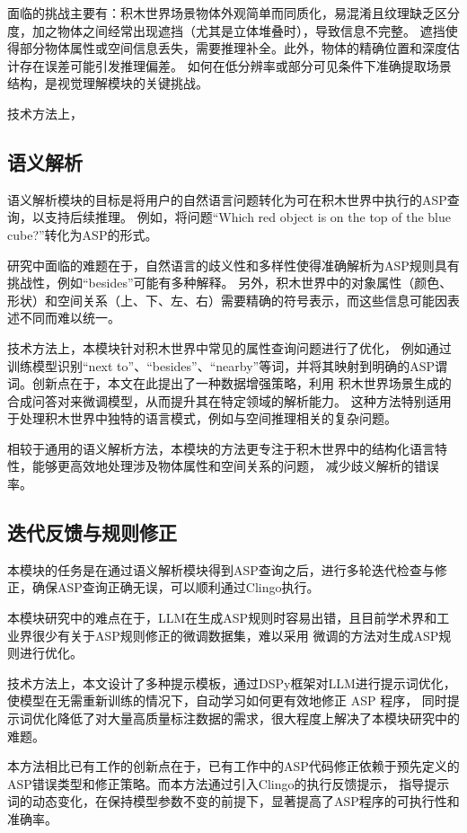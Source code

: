 面临的挑战主要有：积木世界场景物体外观简单而同质化，易混淆且纹理缺乏区分度，加之物体之间经常出现遮挡（尤其是立体堆叠时），导致信息不完整。
遮挡使得部分物体属性或空间信息丢失，需要推理补全。此外，物体的精确位置和深度估计存在误差可能引发推理偏差。
如何在低分辨率或部分可见条件下准确提取场景结构，是视觉理解模块的关键挑战。

技术方法上，
\subsection{语义解析}
语义解析模块的目标是将用户的自然语言问题转化为可在积木世界中执行的ASP查询，以支持后续推理。
例如，将问题“Which red object is on the top of the blue cube?”转化为ASP的形式。

研究中面临的难题在于，自然语言的歧义性和多样性使得准确解析为ASP规则具有挑战性，例如“besides”可能有多种解释。
另外，积木世界中的对象属性（颜色、形状）和空间关系（上、下、左、右）需要精确的符号表示，而这些信息可能因表述不同而难以统一。

技术方法上，本模块针对积木世界中常见的属性查询问题进行了优化，
例如通过训练模型识别“next to”、“besides”、“nearby”等词，并将其映射到明确的ASP谓词。创新点在于，本文在此提出了一种数据增强策略，利用
积木世界场景生成的合成问答对来微调模型，从而提升其在特定领域的解析能力。
这种方法特别适用于处理积木世界中独特的语言模式，例如与空间推理相关的复杂问题。

相较于通用的语义解析方法，本模块的方法更专注于积木世界中的结构化语言特性，能够更高效地处理涉及物体属性和空间关系的问题，
减少歧义解析的错误率。
\subsection{迭代反馈与规则修正}
本模块的任务是在通过语义解析模块得到ASP查询之后，进行多轮迭代检查与修正，确保ASP查询正确无误，可以顺利通过Clingo执行。

本模块研究中的难点在于，LLM在生成ASP规则时容易出错，且目前学术界和工业界很少有关于ASP规则修正的微调数据集，难以采用
微调的方法对生成ASP规则进行优化。

技术方法上，本文设计了多种提示模板，通过DSPy框架对LLM进行提示词优化，使模型在无需重新训练的情况下，自动学习如何更有效地修正 ASP 程序，
同时提示词优化降低了对大量高质量标注数据的需求，很大程度上解决了本模块研究中的难题。

本方法相比已有工作的创新点在于，已有工作中的ASP代码修正依赖于预先定义的ASP错误类型和修正策略。而本方法通过引入Clingo的执行反馈提示，
指导提示词的动态变化，在保持模型参数不变的前提下，显著提高了ASP程序的可执行性和准确率。

